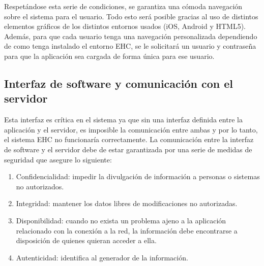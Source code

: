 Respet\'andose esta serie de condiciones, se garantiza una c\'omoda navegaci\'on sobre el sistema para el usuario. Todo esto ser\'a posible gracias al uso de distintos elementos gr\'aficos de los distintos entornos usados (iOS, Android y HTML5). Adem\'as, para que cada usuario tenga una navegaci\'on personalizada dependiendo de como tenga instalado el entorno EHC, se le solicitar\'a un usuario y contrase\~na para que la aplicaci\'on sea cargada de forma \'unica para ese usuario.

\subsection{Interfaz de software y comunicaci\'on con el servidor}
Esta interfaz es cr\'itica en el sistema ya que sin una interfaz definida entre la aplicaci\'on y el servidor, es imposible la comunicaci\'on entre ambas y por lo tanto, el sistema EHC no funcionar\'ia correctamente.
La comunicaci\'on entre la interfaz de software y el servidor debe de estar garantizada por una serie de medidas de seguridad que asegure lo siguiente:

\begin{enumerate}
\item Confidencialidad: impedir la divulgaci\'on de informaci\'on a personas o sistemas no autorizados.
\item Integridad: mantener los datos libres de modificaciones no autorizadas.
\item Disponibilidad: cuando no exista un problema ajeno a la aplicaci\'on relacionado con la conexi\'on a la red, la informaci\'on debe encontrarse a disposici\'on de quienes quieran acceder a ella.
\item Autenticidad: identifica al generador de la informaci\'on. 
\end{enumerate}

